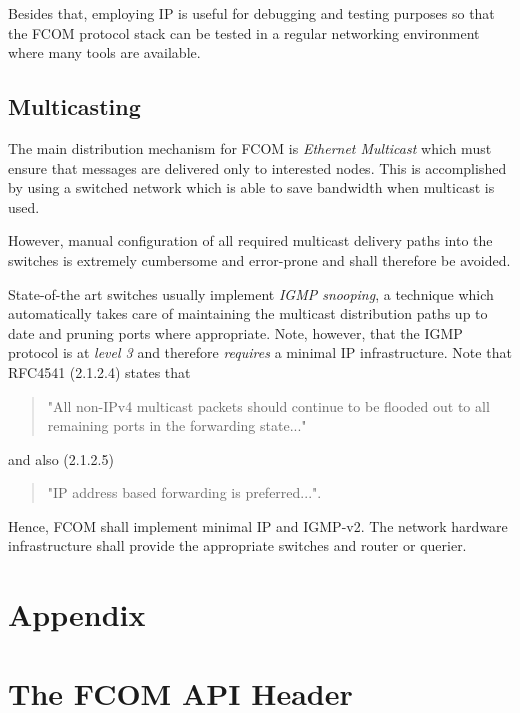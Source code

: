 \documentclass[11pt]{article}
\newcommand{\fcom}{FCOM}
\begin{document}
Besides that, employing IP is useful
for debugging and testing purposes so that the \fcom{}
protocol stack can be tested in a regular networking environment
where many tools are available.

\subsection{Multicasting}
The main distribution mechanism for \fcom{} is {\em Ethernet Multicast}
which must ensure that messages are delivered only to interested
nodes. This is accomplished by using a switched network which
is able to save bandwidth when multicast is used.

However,
manual configuration of all required multicast delivery
paths into the switches is extremely cumbersome and error-prone
and shall therefore be avoided.

State-of-the art switches usually implement {\em IGMP snooping},
a technique
which automatically takes care of maintaining the multicast
distribution paths up to date and pruning ports where appropriate.
Note, however, that the IGMP
protocol is at {\em level 3} and therefore {\em requires}
a minimal IP infrastructure. Note that RFC4541 (2.1.2.4) states
that
\begin{quotation}
\noindent
"All non-IPv4 multicast packets should continue to be
flooded out to all remaining ports in the forwarding state..."
\end{quotation}
and also (2.1.2.5)
\begin{quotation}
\noindent
"IP address based forwarding is preferred...".
\end{quotation}

Hence, \fcom{} shall implement minimal IP and IGMP-v2.
The network hardware infrastructure shall provide the
appropriate switches and router or querier.

\appendix
\pagebreak
\section*{Appendix}

\section{The \fcom{} API Header}
\label{app:api}
%
\lstset{basicstyle=\scriptsize, formfeed=\pagebreak}

\end{document}
